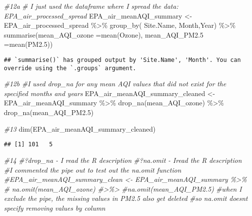\documentclass[
]{article}
\newenvironment{Shaded}{\begin{snugshade}}{\end{snugshade}}
\newcommand{\AttributeTok}[1]{\textcolor[rgb]{0.77,0.63,0.00}{#1}}
\newcommand{\CommentTok}[1]{\textcolor[rgb]{0.56,0.35,0.01}{\textit{#1}}}
\newcommand{\FloatTok}[1]{\textcolor[rgb]{0.00,0.00,0.81}{#1}}
\newcommand{\FunctionTok}[1]{\textcolor[rgb]{0.00,0.00,0.00}{#1}}
\newcommand{\NormalTok}[1]{#1}
\newcommand{\OtherTok}[1]{\textcolor[rgb]{0.56,0.35,0.01}{#1}}
\newcommand{\SpecialCharTok}[1]{\textcolor[rgb]{0.00,0.00,0.00}{#1}}
\begin{document}
\begin{Shaded}
\begin{Highlighting}[]
\CommentTok{\#12a}
\CommentTok{\# I just used the dataframe where I spread the data: EPA\_air\_processed\_spread}
\NormalTok{EPA\_air\_meanAQI\_summary }\OtherTok{\textless{}{-}}\NormalTok{ EPA\_air\_processed\_spread }\SpecialCharTok{\%\textgreater{}\%}
  \FunctionTok{group\_by}\NormalTok{( Site.Name, Month,Year) }\SpecialCharTok{\%\textgreater{}\%}
  \FunctionTok{summarise}\NormalTok{(}\AttributeTok{mean\_AQI\_ozone =}\FunctionTok{mean}\NormalTok{(Ozone),}
            \AttributeTok{mean\_AQI\_PM2.5 =}\FunctionTok{mean}\NormalTok{(PM2}\FloatTok{.5}\NormalTok{))}
\end{Highlighting}
\end{Shaded}

\begin{verbatim}
## `summarise()` has grouped output by 'Site.Name', 'Month'. You can override using the `.groups` argument.
\end{verbatim}

\begin{Shaded}
\begin{Highlighting}[]
\CommentTok{\#12b \#I used drop\_na for any mean AQI values that did not exist for the specified months and years}
\NormalTok{EPA\_air\_meanAQI\_summary\_cleaned }\OtherTok{\textless{}{-}}\NormalTok{ EPA\_air\_meanAQI\_summary }\SpecialCharTok{\%\textgreater{}\%}
  \FunctionTok{drop\_na}\NormalTok{(mean\_AQI\_ozone) }\SpecialCharTok{\%\textgreater{}\%}
  \FunctionTok{drop\_na}\NormalTok{(mean\_AQI\_PM2}\FloatTok{.5}\NormalTok{)}

\CommentTok{\#13}
\FunctionTok{dim}\NormalTok{(EPA\_air\_meanAQI\_summary\_cleaned)}
\end{Highlighting}
\end{Shaded}

\begin{verbatim}
## [1] 101   5
\end{verbatim}

\begin{Shaded}
\begin{Highlighting}[]
\CommentTok{\#14}
\CommentTok{\#?drop\_na {-} I read the R description }
\CommentTok{\#?na.omit {-} Iread the R description }
\CommentTok{\#I commented the pipe out to test out the na.omit function}
\CommentTok{\#EPA\_air\_meanAQI\_summary\_clean \textless{}{-} EPA\_air\_meanAQI\_summary \%\textgreater{}\%}
 \CommentTok{\# na.omit(mean\_AQI\_ozone) \#\textgreater{}\%\textgreater{} }
 \CommentTok{\#na.omit(mean\_AQI\_PM2.5)}
\CommentTok{\#when I exclude the pipe, the missing values in PM2.5 also get deleted }
\CommentTok{\#so na.omit doesn\textquotesingle{}t specify removing values by column }
\end{Highlighting}
\end{Shaded}
\end{document}
